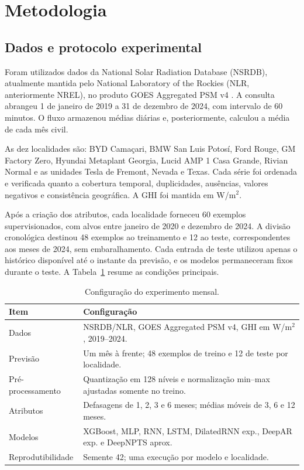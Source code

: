 \documentclass[12pt,a4paper]{article}
\begin{document}
\section{Metodologia}
\label{sec:metodo}

\subsection{Dados e protocolo experimental}

Foram utilizados dados da National Solar Radiation Database (NSRDB), atualmente mantida pelo National Laboratory of the Rockies (NLR, anteriormente NREL), no produto GOES Aggregated PSM v4 \citep{nlr2026}. A consulta abrangeu 1 de janeiro de 2019 a 31 de dezembro de 2024, com intervalo de 60 minutos. O fluxo armazenou médias diárias e, posteriormente, calculou a média de cada mês civil.

As dez localidades são: BYD Camaçari, BMW San Luis Potosí, Ford Rouge, GM Factory Zero, Hyundai Metaplant Georgia, Lucid AMP 1 Casa Grande, Rivian Normal e as unidades Tesla de Fremont, Nevada e Texas. Cada série foi ordenada e verificada quanto a cobertura temporal, duplicidades, ausências, valores negativos e consistência geográfica. A GHI foi mantida em W/m$^2$.

Após a criação dos atributos, cada localidade forneceu 60 exemplos supervisionados, com alvos entre janeiro de 2020 e dezembro de 2024. A divisão cronológica destinou 48 exemplos ao treinamento e 12 ao teste, correspondentes aos meses de 2024, sem embaralhamento. Cada entrada de teste utilizou apenas o histórico disponível até o instante da previsão, e os modelos permaneceram fixos durante o teste. A Tabela~\ref{tab:config} resume as condições principais.

\begin{table}[htbp]
\centering
\caption{Configuração do experimento mensal.}
\label{tab:config}
\renewcommand{\arraystretch}{1.05}
\begin{tabular}{>{\raggedright\arraybackslash}p{4.0cm}>{\raggedright\arraybackslash}p{10.3cm}}
\toprule
\textbf{Item} & \textbf{Configuração} \\
\midrule
Dados & NSRDB/NLR, GOES Aggregated PSM v4, GHI em W/m$^2$, 2019--2024. \\
Previsão & Um mês à frente; 48 exemplos de treino e 12 de teste por localidade. \\
Pré-processamento & Quantização em 128 níveis e normalização min--max ajustadas somente no treino. \\
Atributos & Defasagens de 1, 2, 3 e 6 meses; médias móveis de 3, 6 e 12 meses. \\
Modelos & XGBoost, MLP, RNN, LSTM, DilatedRNN exp., DeepAR exp. e DeepNPTS aprox. \\
Reprodutibilidade & Semente 42; uma execução por modelo e localidade. \\
\bottomrule
\end{tabular}
\end{table}
\end{document}
